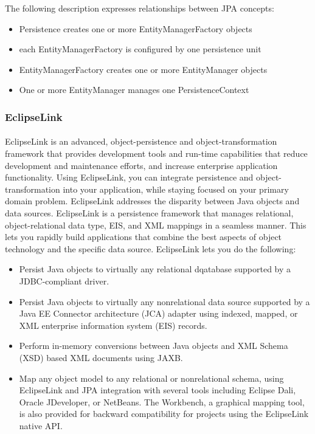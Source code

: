 \begin{itemize}
The following description expresses relationships between JPA concepts:
\begin{itemize}
\item Persistence creates one or more EntityManagerFactory objects
\item each EntityManagerFactory is configured by one persistence unit
\item EntityManagerFactory creates one or more EntityManager objects
\item One or more EntityManager manages one PersistenceContext
\end{itemize}
\end{itemize}
\subsubsection{EclipseLink}
\paragraph{}
EclipseLink is an advanced, object-persistence and object-transformation
framework that provides development tools and run-time capabilities that reduce
development and maintenance efforts, and increase enterprise application
functionality. Using EclipseLink, you can integrate persistence and
object-transformation into your application, while staying focused on your
primary domain problem. EclipseLink addresses the disparity between Java objects
and data sources. EclipseLink is a persistence framework that manages
relational, object-relational data type, EIS, and XML mappings in a seamless
manner. This lets you rapidly build applications that combine the best aspects
of object technology and the specific data source. EclipseLink lets you do the following:

\begin{itemize}
\item Persist Java objects to virtually any relational dqatabase supported by a
JDBC-compliant driver.
\item Persist Java objects to virtually any nonrelational data source supported
by a Java EE Connector architecture (JCA) adapter using indexed, mapped, or XML
enterprise information system (EIS) records.
\item Perform in-memory conversions between Java objects and XML Schema (XSD)
based XML documents using JAXB.
\item Map any object model to any relational or nonrelational schema, using
EclipseLink and JPA integration with several tools including Eclipse Dali,
Oracle JDeveloper, or NetBeans. The Workbench, a graphical mapping tool, is also
provided for backward compatibility for projects using the EclipseLink native API.
\end{itemize}


